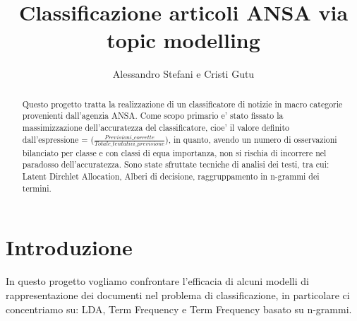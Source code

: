 \documentclass[runningheads]{llncs}
\begin{document}
%
\title{Classificazione articoli ANSA via topic modelling}
%
%
\author{%
  Alessandro Stefani e
  Cristi Gutu}
%
%
%
\maketitle
%
\begin{abstract}
Questo progetto tratta la realizzazione di un classificatore di notizie in macro categorie provenienti dall'agenzia ANSA. 
Come scopo primario e' stato fissato la massimizzazione dell'accuratezza del classificatore, cioe' il valore definito dall'espressione = ($\frac{ Previsioni\_corrette}{Totale\_tentativi\_previsione}$), in quanto, avendo un numero di osservazioni bilanciato per classe e con classi di equa importanza, non si rischia di incorrere nel paradosso dell'accuratezza. Sono state sfruttate tecniche di analisi dei testi,  tra cui: Latent Dirchlet Allocation\cite{LDA},
Alberi di decisione\cite{tree}, raggruppamento  in n-grammi\cite{NGRAM} dei termini.
\end{abstract}

\section{Introduzione}
\label{sec:introduzione}
In questo progetto vogliamo confrontare l'efficacia di alcuni modelli di rappresentazione dei documenti nel problema di classificazione, in particolare ci concentriamo su: LDA, Term Frequency e Term Frequency basato su n-grammi. 
\end{document}
